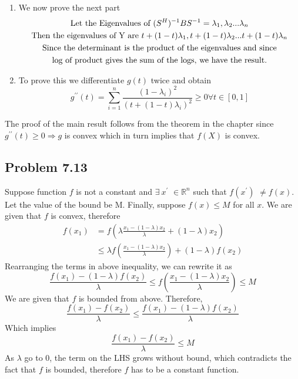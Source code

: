 \documentclass[letterpaper,12pt]{article}
\theoremstyle{definition}
\begin{document}
\begin{itemize}
\begin{enumerate}
    \item We now prove the next part
    \begin{multline*}
    \textnormal{Let the Eigenvalues of } (S^H)^{-1}BS^{-1} = \lambda_1, \lambda_2...\lambda_n\\
    \textnormal{Then the eigenvalues of Y are } t+(1-t)\lambda_1, t+(1-t)\lambda_2...t+(1-t)\lambda_n\\
    \textnormal{Since the determinant is the product of the eigenvalues and since}\\
    \textnormal{log of product gives the sum of the logs, we have the result.}
    \end{multline*}
    
    \item To prove this we differentiate $g(t)$ twice and obtain
    $$g^{\prime\prime}(t) = \sum_{i=1}^{n}\frac{(1-\lambda_i)^2}{(t+(1-t)\lambda_i)^2} \ge 0 \forall t \in [0,1]$$
    \end{enumerate}
    
    The proof of the main result follows from the theorem in the chapter since $g^{\prime\prime}(t) \ge 0 \Rightarrow g$ is convex which in turn implies that $f(X)$ is convex. 
\end{itemize}

\subsection*{Problem 7.13}
Suppose function $f$ is not a constant and $\exists\ x^'$ $\in \mathbb{R}^n$ such that $f (x^')$ $\ne f(x)$. Let the value of the bound be M. Finally, suppose $f(x) \leq M$ for all $x$. We are given that $f$ is convex, therefore
	\begin{align*}
	f(x_1) &= f\left(\lambda \frac{x_1 - (1 - \lambda)x_2}{\lambda} + (1 - \lambda)x_2\right) \\
	&\leq \lambda  f\left(\frac{x_1 - (1 - \lambda)x_2}{\lambda}\right)+ (1 - \lambda)f(x_2)
	\end{align*}
	Rearranging the terms in above inequality, we can rewrite it as 
	\begin{equation}
	\frac{f(x_1) - (1 - \lambda) f(x_2)}{\lambda} \leq f\left(\frac{x_1 - (1 - \lambda)x_2}{\lambda}\right) \leq M
	\end{equation}
	We are given that  $f$ is bounded from above. Therefore,
	\begin{equation}
	\frac{f(x_1) - f(x_2)}{\lambda} \leq \frac{f(x_1) - (1 - \lambda) f(x_2)}{\lambda}
	\end{equation}
	Which implies
	\begin{equation}
	\frac{f(x_1) - f(x_2)}{\lambda} \leq  M
	\end{equation}
	As $\lambda$ go to $0$, the term on the LHS grows without bound, which contradicts the fact that $f$ is bounded, therefore $f$ has to be a constant function. 
\end{document}
